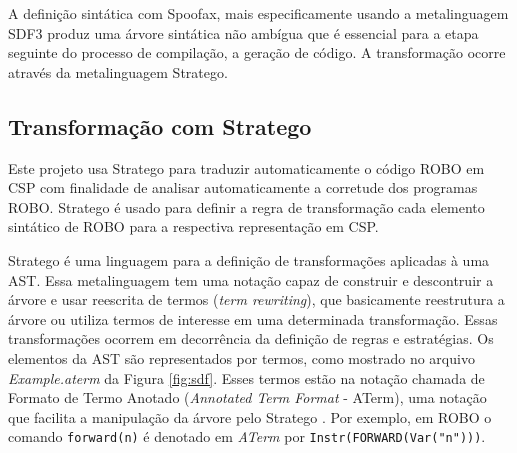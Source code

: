 A definição sintática com Spoofax, mais especificamente usando a metalinguagem SDF3
produz uma árvore sintática não ambígua que é essencial para a etapa seguinte do processo de compilação, a geração de código. A transformação ocorre através da metalinguagem Stratego.

\subsection{Transformação com Stratego}


Este projeto usa Stratego para traduzir automaticamente o código ROBO em CSP com finalidade de analisar automaticamente a corretude dos programas ROBO. Stratego é usado para definir a regra de transformação cada elemento sintático de ROBO para a respectiva representação em CSP.

Stratego é uma linguagem para a definição de transformações aplicadas à uma AST. Essa metalinguagem tem uma notação capaz de construir e descontruir a árvore e usar reescrita de termos (\textit{term rewriting}), que basicamente reestrutura a árvore ou utiliza termos de interesse em uma determinada transformação. Essas transformações ocorrem em decorrência da definição de regras e estratégias. Os elementos da AST são representados por termos, como mostrado no arquivo \textit{Example.aterm} da Figura \ref{fig:sdf}. Esses termos estão na notação chamada de Formato de Termo Anotado (\textit{Annotated Term Format} - ATerm), uma notação que facilita a manipulação da árvore pelo Stratego  \cite{metaborg}. Por exemplo, em ROBO o comando \texttt{forward(n)} é denotado em \textit{ATerm} por \texttt{Instr(FORWARD(Var("n")))}.

